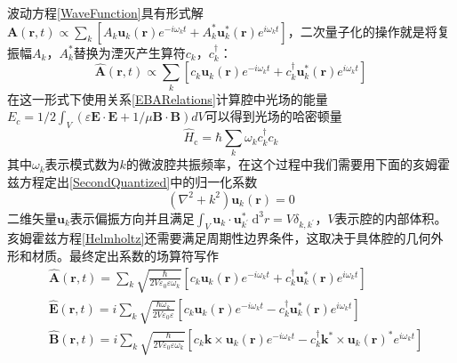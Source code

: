 波动方程\eqref{WaveFunction}具有形式解$\mathbf{A}(\mathbf{r}, t)\propto\sum_{k} \left[A_{k} \mathbf{u}_{k}(\mathbf{r}) e^{-i \omega_{k} t}+ A_{k}^* \mathbf{u}_{k}^*(\mathbf{r}) e^{i \omega_{k} t}\right]$，二次量子化的操作就是将复振幅$A_{k}$，$A_{k}^*$替换为湮灭产生算符$c_{k}$，$c_{k}^{\dag}$：
\begin{equation}
\hat{\mathbf{A}}(\mathbf{r}, t)\propto\sum_{k} \left[c_{k} \mathbf{u}_{k}(\mathbf{r}) e^{-i \omega_{k} t}+ c_{k}^{\dag} \mathbf{u}_{k}^*(\mathbf{r}) e^{i \omega_{k} t}\right] 
\label{SecondQuantized}
\end{equation}
在这一形式下使用关系\eqref{EBARelations}计算腔中光场的能量$E_c=1/2 \int_{V}\left(\varepsilon \mathbf{E} \cdot \mathbf{E}+1/\mu \mathbf{B} \cdot \mathbf{B}\right) d V$可以得到光场的哈密顿量
\begin{equation}
\hat{H}_{\mathrm{c}} = \hbar \sum_{k} \omega_{k} c_{k}^{\dag} c_{k}
\label{CavityHamiltonian}
\end{equation}
其中$\omega_{k}$表示模式数为$k$的微波腔共振频率，在这个过程中我们需要用下面的亥姆霍兹方程定出\eqref{SecondQuantized}中的归一化系数
\begin{equation}
\left(\nabla^{2}+k^{2}\right) \mathbf{u}_{k}(\mathbf{r})=0
\label{Helmholtz}
\end{equation}
二维矢量$\mathbf{u}_{k}$表示偏振方向并且满足$\int_{V} \mathbf{u}_{k} \cdot \mathbf{u}_{k^{\prime}}^{*} \mathrm{~d}^{3} r=V \delta_{k, k^{\prime}}$，$V$表示腔的内部体积。亥姆霍兹方程\eqref{Helmholtz}还需要满足周期性边界条件，这取决于具体腔的几何外形和材质。最终定出系数的场算符写作
\begin{align}
&\hat{\mathbf{A}}(\mathbf{r}, t)= \sum_{k} \sqrt{\frac{\hbar}{2 V \varepsilon_{0} \varepsilon \omega_{k}}} \left[ c_{k} \mathbf{u}_{k}(\mathbf{r}) e^{-i \omega_{k} t} + c_{k}^{\dag} \mathbf{u}_{k}^{*} (\mathbf{r}) e^{i \omega_{k} t} \right] \\
&\hat{\mathbf{E}}(\mathbf{r}, t)=i \sum_{k} \sqrt{\frac{\hbar \omega_{k}}{2 V \varepsilon_{0} \varepsilon}} \left[ c_{k} \mathbf{u}_{k}(\mathbf{r}) e^{-i \omega_{k} t} - c_{k}^{\dag} \mathbf{u}_{k}^{*} (\mathbf{r}) e^{i \omega_{k} t} \right] \\
&\hat{\mathbf{B}}(\mathbf{r}, t)=i \sum_{k} \sqrt{\frac{\hbar}{2 V \varepsilon_{0} \varepsilon \omega_{k}}} \left[ c_{k} \mathbf{k} \times \mathbf{u}_{k}(\mathbf{r}) e^{-i \omega_{k} t} - c_{k}^{\dag} \mathbf{k}^* \times \mathbf{u}_{k}(\mathbf{r})^* e^{i \omega_{k} t} \right]
\label{BOperator}
\end{align}

